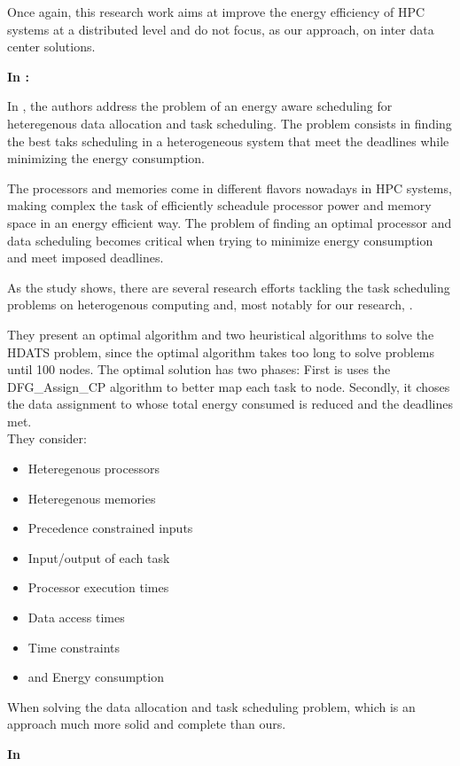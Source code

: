 Once again, this research work aims at improve the energy efficiency of HPC
systems at a distributed level and do not focus, as our approach, on inter data
center solutions.

 
\textbf{In \cite{TASK_SCHED}:}

In \cite{TASK_SCHED}, the authors address the problem of an energy aware
scheduling for heteregenous data allocation and task scheduling. The problem
consists in finding the best taks scheduling in a heterogeneous system that meet
the deadlines while minimizing the energy consumption.

The processors and memories come in different flavors nowadays in HPC
systems, making complex the task of efficiently scheadule processor power and 
memory space in an energy efficient way. The problem of finding an optimal
processor and data scheduling becomes critical when trying to minimize energy 
consumption and meet imposed deadlines.

As the study shows, there are several research efforts tackling the task
scheduling problems on heterogenous computing and, most notably for our
research, \cite{EFF_DSP}.

They present an optimal algorithm and two heuristical algorithms to solve the
HDATS problem, since the optimal algorithm takes too long to solve problems
until 100 nodes. The optimal solution has two phases: First is uses the
DFG\_Assign\_CP algorithm to better map each task to node. Secondly, it choses the
data assignment to whose total energy consumed is reduced and the deadlines met.
\\
They consider:
\begin{itemize}
  \item Heteregenous processors 
  \item Heteregenous memories
  \item Precedence constrained inputs
  \item Input/output of each task 
  \item Processor execution times
  \item Data access times
  \item Time constraints 
  \item and Energy consumption
\end{itemize}

When solving the data allocation and task scheduling problem, which is an
approach much more solid and complete than ours.


\textbf{In \cite{EXE_METHOD}}

